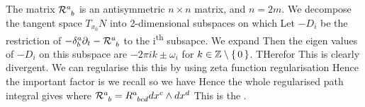 \documentclass{article}
\begin{document}
The matrix $ \mc{R}\indices{^a_b}$ is an antisymmetric $n\times n$ matrix, and $n=2m$. We decompose the tangent space $T_{x_0} N$ into 2-dimensional subspaces on which 
Let $-D_i$ be the restriction of $-\delta^a_b \del_t - \mc{R}\indices{^a_b}$ to the i\textsuperscript{th} subsapce. We expand 
Then the eigen values of $-D_i$ on this subspace are $-2\pi i k \pm \omega_i$ for $k\in \mathbb{Z}\setminus\set{0}$. THerefor 
This is clearly divergent. We can regularise this this by using zeta function regularisation 
Hence the important factor is 
we recall 
so we have 
Hence the whole regularised path integral gives 
where $\mc{R}\indices{^a_b} = R\indices{^a_b_c_d} dx^c \wedge dx^d$
This is the . 

\end{document}
